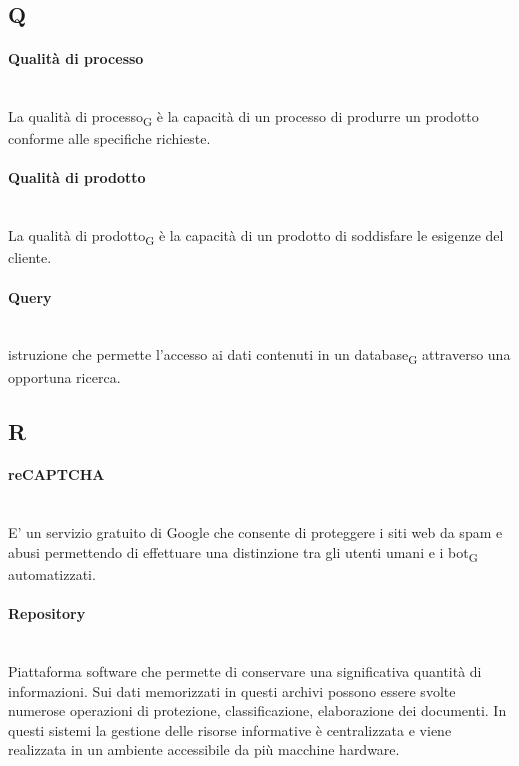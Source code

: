 \subsection*{Q}
\paragraph{Qualità di processo}~\smallskip \\
La qualità di processo\textsubscript{G} è la capacità di un processo di produrre un prodotto conforme alle specifiche richieste.

\paragraph{Qualità di prodotto}~\smallskip \\
La qualità di prodotto\textsubscript{G} è la capacità di un prodotto di soddisfare le esigenze del cliente.
\paragraph{Query}~\smallskip \\
istruzione che permette l'accesso ai dati contenuti in un database\textsubscript{G} attraverso una opportuna ricerca.

\newpage
{}
\subsection*{R}
\paragraph{reCAPTCHA}~\smallskip \\
E' un servizio gratuito di Google che consente di proteggere i siti web da spam e abusi permettendo di effettuare una distinzione tra gli utenti umani e i bot\textsubscript{G} automatizzati.

\paragraph{Repository}~\smallskip \\
Piattaforma software che permette di conservare una significativa quantità di informazioni. Sui dati memorizzati in questi archivi possono essere svolte numerose operazioni di protezione, classificazione, elaborazione dei documenti. In questi sistemi la gestione delle risorse informative è centralizzata e viene realizzata in un ambiente accessibile da più macchine hardware.


